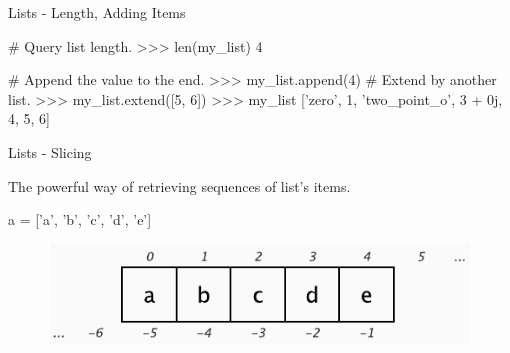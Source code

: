 \documentclass[10pt]{beamer}
\begin{document}
\begin{frame}[fragile]{Lists - Length, Adding Items}
	\begin{pythoncode}
		# Query list length.
		>>> len(my_list) 
		4
	\end{pythoncode}

	\pause
	\begin{pythoncode}
		# Append the value to the end.
		>>> my_list.append(4)  
		# Extend by another list.
		>>> my_list.extend([5, 6])  
		>>> my_list
		['zero', 1, 'two_point_o', 3 + 0j, 4, 5, 6]
	\end{pythoncode}
\end{frame}

\begin{frame}[fragile]{Lists - Slicing}
	
	The powerful way of retrieving sequences of list's items.
	
	\pause
	\begin{pythoncode}
		a = ['a', 'b', 'c', 'd', 'e']
	\end{pythoncode}
	
	\pause
	\begin{figure}[!h]
		\centering
		\includegraphics[width=0.6\linewidth]{img/slicing.pdf}		
	\end{figure}
\end{frame}
\end{document}
